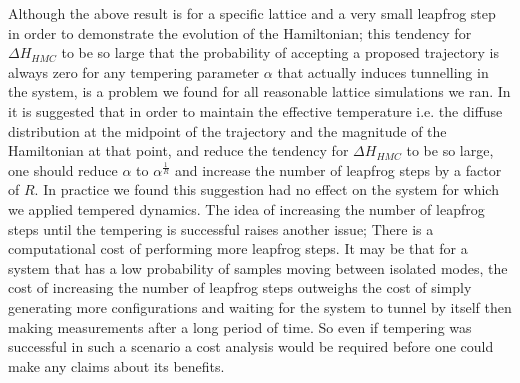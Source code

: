 \documentclass[12pt]{article}
\begin{document}
Although the above result is for a specific lattice and a very small leapfrog step in order to demonstrate the evolution of the Hamiltonian; this tendency for $\Delta H_{HMC}$ to be so large that the probability of accepting a proposed trajectory is always zero for any tempering parameter $\alpha$ that actually induces tunnelling in the system, is a problem we found for all reasonable lattice simulations we ran. In \cite{neal_2011} it is suggested that in order to maintain the effective temperature i.e. the diffuse distribution at the midpoint of the trajectory and the magnitude of the Hamiltonian at that point, and reduce the tendency for $\Delta H_{HMC}$ to be so large, one should reduce $\alpha$ to $\alpha^{\frac{1}{R}}$ and increase the number of leapfrog steps by a factor of $R$. In practice we found this suggestion had no effect on the system for which we applied tempered dynamics. The idea of increasing the number of leapfrog steps until the tempering is successful raises another issue; There is a computational cost of performing more leapfrog steps. It may be that for a system that has a low probability of samples moving between isolated modes, the cost of increasing the number of leapfrog steps outweighs the cost of simply generating more configurations and waiting for the system to tunnel by itself then making measurements after a long period of time. So even if tempering was successful in such a scenario a cost analysis would be required before one could make any claims about its benefits. 
\end{document}
